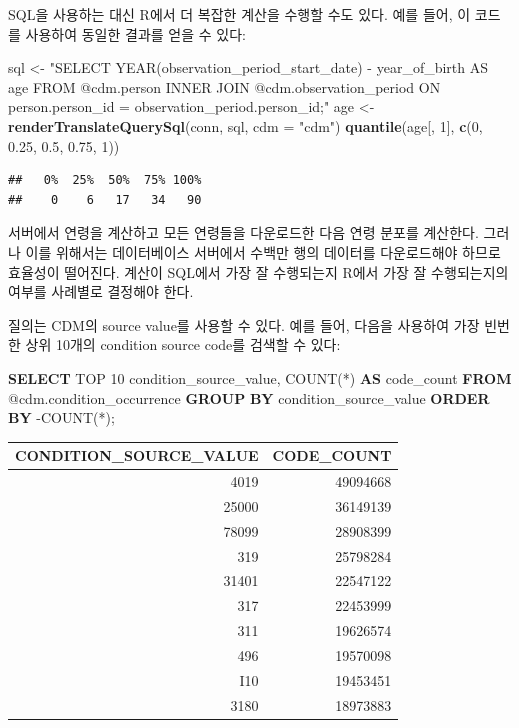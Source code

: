\documentclass[11pt]{book}
\newenvironment{Shaded}{\begin{snugshade}}{\end{snugshade}}
\newcommand{\KeywordTok}[1]{\textcolor[rgb]{0.13,0.29,0.53}{\textbf{#1}}}
\newcommand{\DataTypeTok}[1]{\textcolor[rgb]{0.13,0.29,0.53}{#1}}
\newcommand{\DecValTok}[1]{\textcolor[rgb]{0.00,0.00,0.81}{#1}}
\newcommand{\FloatTok}[1]{\textcolor[rgb]{0.00,0.00,0.81}{#1}}
\newcommand{\StringTok}[1]{\textcolor[rgb]{0.31,0.60,0.02}{#1}}
\newcommand{\FunctionTok}[1]{\textcolor[rgb]{0.00,0.00,0.00}{#1}}
\newcommand{\NormalTok}[1]{#1}
\theoremstyle{definition}
\theoremstyle{definition}
\theoremstyle{definition}
\theoremstyle{remark}
\begin{document}
SQL을 사용하는 대신 R에서 더 복잡한 계산을 수행할 수도 있다. 예를 들어,
이 코드를 사용하여 동일한 결과를 얻을 수 있다:

\begin{Shaded}
\begin{Highlighting}[]
\NormalTok{sql <-}\StringTok{ "SELECT YEAR(observation_period_start_date) -}
\StringTok{               year_of_birth AS age}
\StringTok{FROM @cdm.person}
\StringTok{INNER JOIN @cdm.observation_period}
\StringTok{  ON person.person_id = observation_period.person_id;"}
\NormalTok{age <-}\StringTok{ }\KeywordTok{renderTranslateQuerySql}\NormalTok{(conn, sql, }\DataTypeTok{cdm =} \StringTok{"cdm"}\NormalTok{)}
\KeywordTok{quantile}\NormalTok{(age[, }\DecValTok{1}\NormalTok{], }\KeywordTok{c}\NormalTok{(}\DecValTok{0}\NormalTok{, }\FloatTok{0.25}\NormalTok{, }\FloatTok{0.5}\NormalTok{, }\FloatTok{0.75}\NormalTok{, }\DecValTok{1}\NormalTok{))}
\end{Highlighting}
\end{Shaded}

\begin{verbatim}
##   0%  25%  50%  75% 100% 
##    0    6   17   34   90
\end{verbatim}

서버에서 연령을 계산하고 모든 연령들을 다운로드한 다음 연령 분포를
계산한다. 그러나 이를 위해서는 데이터베이스 서버에서 수백만 행의
데이터를 다운로드해야 하므로 효율성이 떨어진다. 계산이 SQL에서 가장 잘
수행되는지 R에서 가장 잘 수행되는지의 여부를 사례별로 결정해야 한다.

질의는 CDM의 source value를 사용할 수 있다. 예를 들어, 다음을 사용하여
가장 빈번한 상위 10개의 condition source code를 검색할 수 있다:

\begin{Shaded}
\begin{Highlighting}[]
\KeywordTok{SELECT}\NormalTok{ TOP }\DecValTok{10}\NormalTok{ condition_source_value, }
  \FunctionTok{COUNT}\NormalTok{(*) }\KeywordTok{AS}\NormalTok{ code_count}
\KeywordTok{FROM}\NormalTok{ @cdm.condition_occurrence}
\KeywordTok{GROUP} \KeywordTok{BY}\NormalTok{ condition_source_value}
\KeywordTok{ORDER} \KeywordTok{BY}\NormalTok{ -COUNT(*);}
\end{Highlighting}
\end{Shaded}

\begin{longtable}[]{@{}rr@{}}
\toprule
CONDITION\_SOURCE\_VALUE & CODE\_COUNT\tabularnewline
\midrule
\endhead
4019 & 49094668\tabularnewline
25000 & 36149139\tabularnewline
78099 & 28908399\tabularnewline
319 & 25798284\tabularnewline
31401 & 22547122\tabularnewline
317 & 22453999\tabularnewline
311 & 19626574\tabularnewline
496 & 19570098\tabularnewline
I10 & 19453451\tabularnewline
3180 & 18973883\tabularnewline
\bottomrule
\end{longtable}
\end{document}
